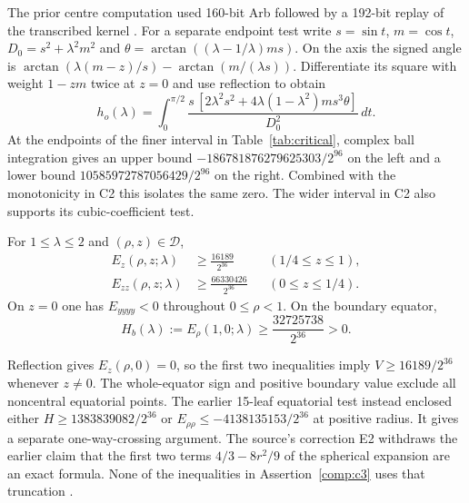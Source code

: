 The prior centre computation used 160-bit Arb followed by a 192-bit replay of the transcribed kernel \citep{data-center-axis}. For a separate endpoint test write $s=\sin t$, $m=\cos t$, $D_0=s^2+\lambda^2 m^2$ and $\theta=\arctan((\lambda-1/\lambda)ms)$. On the axis the signed angle is $\arctan(\lambda(m-z)/s)-\arctan(m/(\lambda s))$. Differentiate its square with weight $1-zm$ twice at $z=0$ and use reflection to obtain
\[
 h_o(\lambda)=\int_0^{\pi/2}
 \frac{s\,[2\lambda^2s^2+4\lambda(1-\lambda^2)m s^3\theta]}{D_0^2}\,dt .
\]
At the endpoints of the finer interval in Table~\ref{tab:critical}, complex ball integration gives an upper bound $-186781876279625303/2^{96}$ on the left and a lower bound $10585972787056429/2^{96}$ on the right. Combined with the monotonicity in C2 this isolates the same zero. The wider interval in C2 also supports its cubic-coefficient test.

\begin{computationalassertion}
\label{comp:c3}
For $1\leq\lambda\leq2$ and $(\rho,z)\in\mathcal D$,
\begin{align*}
 E_z(\rho,z;\lambda)&\geq\frac{16189}{2^{36}}
       &&(1/4\leq z\leq1),\\
 E_{zz}(\rho,z;\lambda)&\geq\frac{66330426}{2^{36}}
       &&(0\leq z\leq1/4).
\end{align*}
On $z=0$ one has $E_{yyyy}<0$ throughout $0\leq\rho<1$. On the boundary equator,
\[
 H_b(\lambda):=E_\rho(1,0;\lambda)
 \geq\frac{32725738}{2^{36}}>0.
\]
\end{computationalassertion}

Reflection gives $E_z(\rho,0)=0$, so the first two inequalities imply
$V\geq16189/2^{36}$ whenever $z\ne0$.
The whole-equator sign and positive boundary value exclude all noncentral equatorial points. The earlier 15-leaf equatorial test instead enclosed either $H\geq1383839082/2^{36}$ or $E_{\rho\rho}\leq-4138135153/2^{36}$ at positive radius. It gives a separate one-way-crossing argument.
The source's correction E2 withdraws the earlier claim that the first
two terms $4/3-8r^2/9$ of the spherical expansion are an exact formula.
None of the inequalities in Assertion~\ref{comp:c3} uses that truncation \citep{data-near-sphere}.

